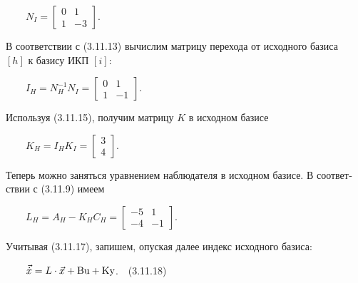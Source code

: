 \documentclass[a4paper]{article}
\newcommand\normalsubformula[1]{\text{\mathversion{normal}$#1$}}
\begin{document}
{\begin{russian}\sffamily
\ \ \ \  $N_I=\left[\begin{matrix}0&1\\1&-3\end{matrix}\right]$.
\end{russian}}

{\begin{russian}\sffamily
В соответствии с (3.11.13) вычислим матрицу перехода от исходного базиса \ \  $[h]$ к базису ИКП  $[i]$:
\end{russian}}

{\begin{russian}\sffamily
\ \ \ \  $I_H=N_H^{-1}N_I=\left[\begin{matrix}0&1\\1&-1\end{matrix}\right]$.
\end{russian}}

{\begin{russian}\sffamily
Используя (3.11.15), получим матрицу  $K$ в исходном базисе
\end{russian}}

{\begin{russian}\sffamily
\ \ \ \  $K_H=I_HK_I=\left[\begin{matrix}3\\4\end{matrix}\right]$.
\end{russian}}

{\begin{russian}\sffamily
Теперь можно заняться уравнением наблюдателя в исходном базисе. В соответствии с (3.11.9) имеем
\end{russian}}

{\begin{russian}\sffamily
\ \ \ \  $L_H=A_H-K_HC_H=\left[\begin{matrix}-5&1\\-4&-1\end{matrix}\right]$.
\end{russian}}

{\begin{russian}\sffamily
Учитывая (3.11.17), запишем, опуская далее индекс исходного базиса:
\end{russian}}

{\begin{russian}\sffamily
\ \ \ \  $\vec{\dot x}=L\cdot \vec x+\normalsubformula{\text{Bu}}+\normalsubformula{\text{Ky}}$.\ \ (3.11.18)
\end{russian}}
\end{document}
